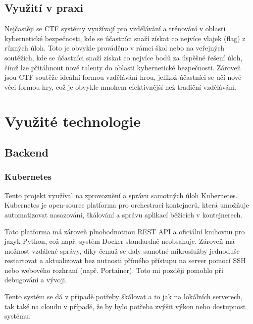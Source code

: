 \documentclass[12pt, a4paper,
oneside,      %
openright
]{report}
\begin{document}
\section{Využití v praxi}
Nejčastěji se CTF systémy využívají pro vzdělávání a trénování v oblasti kybernetické bezpečnosti, kde se účastníci snaží získat co nejvíce vlajek (flag) z různých úloh. Toto je obvykle prováděno v rámci škol nebo na veřejných soutěžích, kde se účastníci snaží získat co nejvíce bodů za úspěšné řešení úloh, čímž lze přitáhnout nové talenty do oblasti kybernetické bezpečnosti. Zároveň jsou CTF soutěže ideální formou vzdělávání hrou, jelikož účastníci se učí nové věci formou hry, což je obvykle mnohem efektivnější než tradiční vzdělávání.



\chapter{Využité technologie}

\section{Backend}

\subsection{Kubernetes}
Tento projekt využíval na zprovoznění a správu samotných úloh Kubernetes. Kubernetes je open-source platforma pro orchestraci kontejnerů, která umožňuje automatizovat nasazování, škálování a správu aplikací běžících v kontejnerech. 

Tato platforma má zároveň plnohodnotnou REST API a oficiální knihovnu pro jazyk Python, což např. systém Docker standardně neobsahuje. Zároveň má možnost vzdálené správy, díky čemuž se daly samotné mikroslužby jednoduše restartovat a aktualizovat bez nutnosti přímého přístupu na server pomocí SSH nebo webového rozhraní (např. Portainer). Toto mi později pomohlo při debugování a vývoji.

Tento systém se dá v případě potřeby škálovat a to jak na lokálních serverech, tak také na cloudu v případě, že by bylo potřeba zvýšit výkon nebo dostupnost systému.
\end{document}
